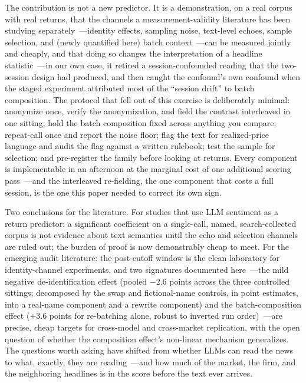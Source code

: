 The contribution is not a new predictor. It is a demonstration, on a real corpus with real returns, that the channels a measurement-validity literature has been studying separately~---identity effects, sampling noise, text-level echoes, sample selection, and (newly quantified here) batch context~---can be measured jointly and cheaply, and that doing so changes the interpretation of a headline statistic~---in our own case, it retired a session-confounded reading that the two-session design had produced, and then caught the confound's own confound when the staged experiment attributed most of the ``session drift'' to batch composition. The protocol that fell out of this exercise is deliberately minimal: anonymize once, verify the anonymization, and field the contrast interleaved in one sitting; hold the batch composition fixed across anything you compare; repeat-call once and report the noise floor; flag the text for realized-price language and audit the flag against a written rulebook; test the sample for selection; and pre-register the family before looking at returns. Every component is implementable in an afternoon at the marginal cost of one additional scoring pass~---and the interleaved re-fielding, the one component that costs a full session, is the one this paper needed to correct its own sign.

Two conclusions for the literature. For studies that use LLM sentiment as a return predictor: a significant coefficient on a single-call, named, search-collected corpus is not evidence about text semantics until the echo and selection channels are ruled out; the burden of proof is now demonstrably cheap to meet. For the emerging audit literature: the post-cutoff window is the clean laboratory for identity-channel experiments, and two signatures documented here~---the mild negative de-identification effect (pooled $-2.6$ points across the three controlled sittings; decomposed by the swap and fictional-name controls, in point estimates, into a real-name component and a rewrite component) and the batch-composition effect ($+3.6$ points for re-batching alone, robust to inverted run order)~---are precise, cheap targets for cross-model and cross-market replication, with the open question of whether the composition effect's non-linear mechanism generalizes. The questions worth asking have shifted from whether LLMs can read the news to what, exactly, they are reading~---and how much of the market, the firm, and the neighboring headlines is in the score before the text ever arrives.
